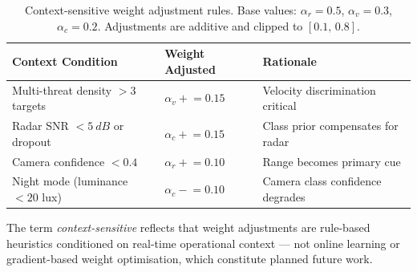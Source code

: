 \documentclass[drones,article,submit,pdftex]{Definitions/mdpi}
\begin{document}
\begin{table}[ht]
  \centering
  \caption{Context-sensitive weight adjustment rules.
           Base values: $\alpha_r=0.5$, $\alpha_v=0.3$, $\alpha_c=0.2$.
           Adjustments are additive and clipped to $[0.1,\,0.8]$.}
  \label{tab:alpha_rules}
  \begin{tabular}{lll}
    \toprule
    Context Condition & Weight Adjusted & Rationale \\
    \midrule
    Multi-threat density $> 3$ targets  & $\alpha_v \mathrel{+}= 0.15$ & Velocity discrimination critical \\
    Radar SNR $< \SI{5}{dB}$ or dropout & $\alpha_c \mathrel{+}= 0.15$ & Class prior compensates for radar \\
    Camera confidence $< 0.4$           & $\alpha_r \mathrel{+}= 0.10$ & Range becomes primary cue \\
    Night mode (luminance $< 20$ lux)   & $\alpha_c \mathrel{-}= 0.10$ & Camera class confidence degrades \\
    \bottomrule
  \end{tabular}
\end{table}

The term \emph{context-sensitive} reflects that weight adjustments are
rule-based heuristics conditioned on real-time operational context ---
not online learning or gradient-based weight optimisation, which constitute
planned future work.
\end{document}
